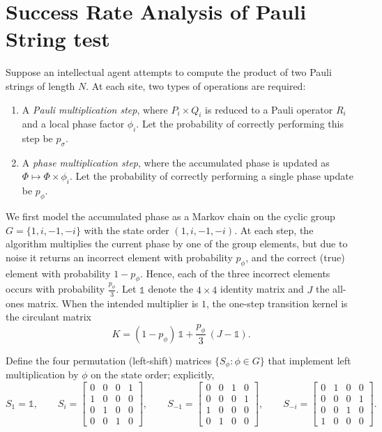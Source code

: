 \documentclass{article}
\theoremstyle{plain}
\begin{document}



\newpage
\appendix

\section{Success Rate Analysis of Pauli String test}\label{app:pauli_sar}

Suppose an intellectual agent attempts to compute the product of two Pauli strings of length $N$.
At each site, two types of operations are required:

\begin{enumerate}
    \item A \emph{Pauli multiplication step}, where $P_i \times Q_i$ is reduced to a Pauli operator $R_i$ and a local phase factor $\phi_i$. Let the probability of correctly performing this step be $p_{\sigma}$.
    \item A \emph{phase multiplication step}, where the accumulated phase is updated as $\Phi \mapsto \Phi \times \phi_i$. Let the probability of correctly performing a single phase update be $p_{\phi}$.
\end{enumerate}

We first model the accumulated phase as a Markov chain on the cyclic group
\(G = \{1, i, -1, -i\}\) with the state order \((1, i, -1, -i)\).
At each step, the algorithm multiplies the current phase by one of the group elements,
but due to noise it returns an incorrect element with probability $p_{\phi}$,
and the correct (true) element with probability \(1 - p_{\phi}\).
Hence, each of the three incorrect elements occurs with probability \(\tfrac{p_{\phi}}{3}\).
Let \(\mathds{1}\) denote the \(4\times4\) identity matrix and \(J\) the all-ones matrix.
When the intended multiplier is \(1\), the one-step transition kernel is the circulant matrix
\begin{equation}
    K = (1 - p_{\phi})\,\mathds{1} + \frac{p_{\phi}}{3}\,(J - \mathds{1}).
\end{equation}

Define the four permutation (left-shift) matrices \(\{S_\phi:\phi\in G\}\) that implement left multiplication by \(\phi\) on the state order; explicitly,
\[
S_1=\mathds{1},\qquad
S_i=\begin{bmatrix}
0&0&0&1\\
1&0&0&0\\
0&1&0&0\\
0&0&1&0
\end{bmatrix},\qquad
S_{-1}=\begin{bmatrix}
0&0&1&0\\
0&0&0&1\\
1&0&0&0\\
0&1&0&0
\end{bmatrix},\qquad
S_{-i}=\begin{bmatrix}
0&1&0&0\\
0&0&0&1\\
0&0&1&0\\
1&0&0&0
\end{bmatrix}.
\]
\end{document}
